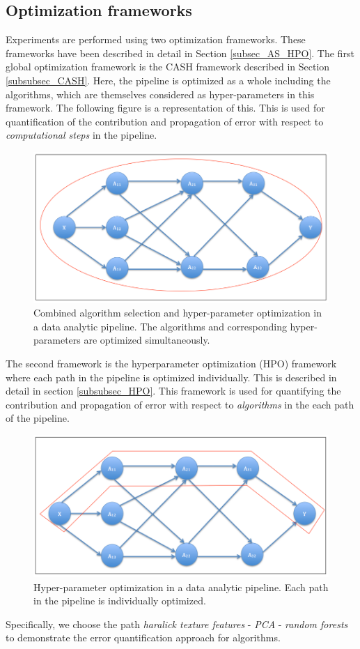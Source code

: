 \subsection{Optimization frameworks}
\label{frameworks}
Experiments are performed using two optimization frameworks. These frameworks have been described in detail in Section \ref{subsec_AS_HPO}. 
The first global optimization framework is the CASH framework described in Section \ref{subsubsec_CASH}. Here, the pipeline is optimized as a whole including the algorithms, which are themselves considered as hyper-parameters in this framework. The following figure is a representation of this. This is used for quantification of the contribution and propagation of error with respect to \textit{computational steps} in the pipeline.
\begin{figure}[H]
    \centering
    \includegraphics[scale=0.4]{img/EP/CASH}
    \caption{Combined algorithm selection and hyper-parameter optimization in a data analytic pipeline. The algorithms and corresponding hyper-parameters are optimized simultaneously.}
    \label{fig:CASH}
\end{figure}
The second framework is the hyperparameter optimization (HPO) framework where each path in the pipeline is optimized individually. This is described in detail in section \ref{subsubsec_HPO}. This framework is used for quantifying the contribution and propagation of error with respect to \textit{algorithms} in the each path of the pipeline.
\begin{figure}[H]
    \centering
    \includegraphics[scale=0.4]{img/EP/HPO}
    \caption{Hyper-parameter optimization in a data analytic pipeline. Each path in the pipeline is individually optimized.}
    \label{fig:HPO}
\end{figure}
Specifically, we choose the path \textit{haralick texture features} - \textit{PCA} - \textit{random forests} to demonstrate the error quantification approach for algorithms.

